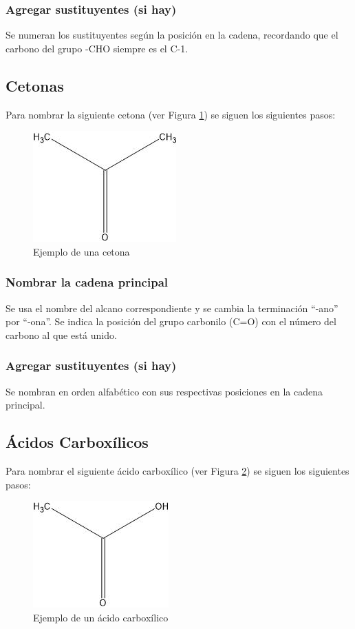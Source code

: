\documentclass{article}
\begin{document}
\subsubsection{Agregar sustituyentes (si hay)}
Se numeran los sustituyentes según la posición en la cadena, recordando que el carbono del grupo -CHO siempre es el C-1.

\subsection{Cetonas}
Para nombrar la siguiente cetona (ver Figura \ref{fig:cetona}) se siguen los siguientes pasos:
\begin{figure}[h]
    \centering
    \includegraphics[width=0.5\linewidth]{media/propanona.jpg}
    \caption{Ejemplo de una cetona}
    \label{fig:cetona}
\end{figure}

\subsubsection{Nombrar la cadena principal}
Se usa el nombre del alcano correspondiente y se cambia la terminación ``-ano'' por ``-ona''. Se indica la posición del grupo carbonilo (C=O) con el número del carbono al que está unido.

\subsubsection{Agregar sustituyentes (si hay)}
Se nombran en orden alfabético con sus respectivas posiciones en la cadena principal.

\subsection{Ácidos Carboxílicos}
Para nombrar el siguiente ácido carboxílico (ver Figura \ref{fig:acido_carboxilico}) se siguen los siguientes pasos:
\begin{figure}[h]
    \centering
    \includegraphics[width=0.5\linewidth]{media/ácido acético.jpg}
    \caption{Ejemplo de un ácido carboxílico}
    \label{fig:acido_carboxilico}
\end{figure}
\end{document}
